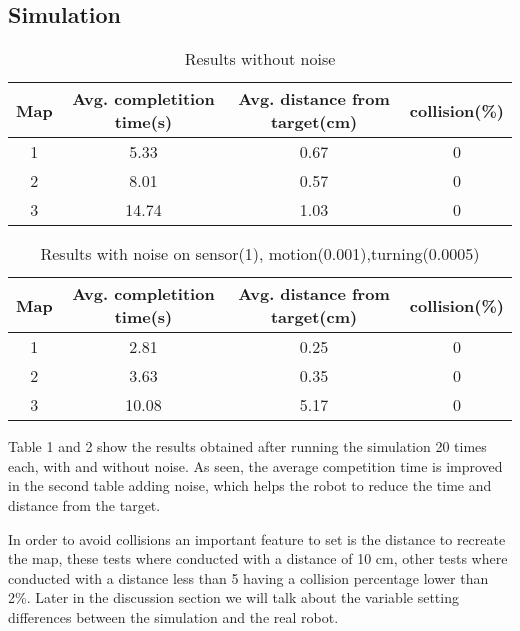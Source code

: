 \subsection{Simulation}
\begin{table}[h]
\begin{center}
	\begin{tabular}{ |c|c|c|c| }
		\hline
		Map & \multicolumn{1}{|p{3cm}|}{\centering Avg. completition time(s) } &\multicolumn{1}{|p{3cm}|}{\centering Avg. distance from target(cm) }  & collision(\%)  \\ 
		\hline
		\hline
		1 & 5.33 & 0.67 & 0 \\  
		2 & 8.01 & 0.57 & 0 \\ 
		3 & 14.74 & 1.03 & 0 \\ 
		\hline 
	\end{tabular}
	\caption{Results without noise}
	\label{table:nonoise}
\end{center}
\end{table}

\begin{table}[h]
\begin{center}
	\begin{tabular}{ |c|c|c|c| }
		\hline
		Map & \multicolumn{1}{|p{3cm}|}{\centering Avg. completition time(s) } &\multicolumn{1}{|p{3cm}|}{\centering Avg. distance from target(cm) }  & collision(\%)  \\ 
		\hline
		\hline
		1 & 2.81 & 0.25  & 0 \\  
		2 & 3.63 & 0.35  & 0 \\ 
		3 & 10.08 & 5.17  & 0 \\ 
		\hline 
	\end{tabular}
	\label{table:noise}
	\caption{Results with noise on sensor(1), motion(0.001),turning(0.0005)}
\end{center}
\end{table}

Table 1 and 2 show the results obtained after running the simulation 20 times each, with and without noise. As seen, the average competition time is improved in the second table adding noise, which helps the robot to reduce the time and distance from the target. 

In order to avoid collisions an important feature to set is the distance to recreate the map, these tests where conducted with a distance of 10 cm, other tests where conducted with a distance less than 5 having a collision percentage lower than 2\%. Later in the discussion section we will talk about the variable setting differences between the simulation and the real robot. 

\FloatBarrier